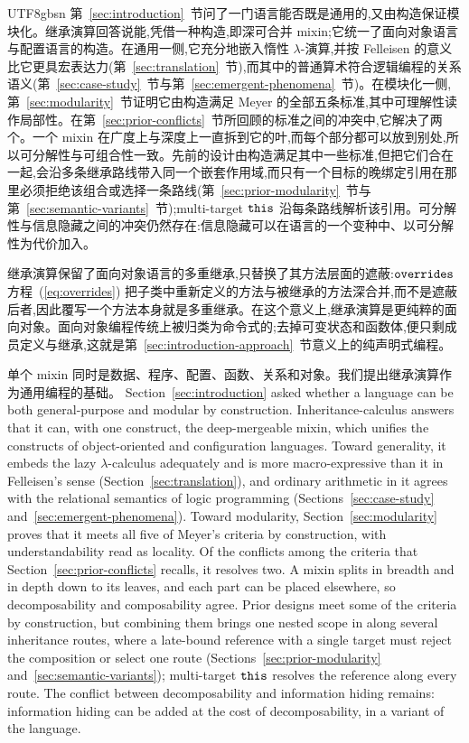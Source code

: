 \begin{CJK*}{UTF8}{gbsn}
\ifPaperChinese
第~\ref{sec:introduction}~节问了一门语言能否既是通用的,又由构造保证模块化。继承演算回答说能,凭借一种构造,即深可合并 mixin;它统一了面向对象语言与配置语言的构造。在通用一侧,它充分地嵌入惰性 $\lambda$-演算,并按 Felleisen 的意义比它更具宏表达力(第~\ref{sec:translation}~节),而其中的普通算术符合逻辑编程的关系语义(第~\ref{sec:case-study}~节与第~\ref{sec:emergent-phenomena}~节)。在模块化一侧,第~\ref{sec:modularity}~节证明它由构造满足 Meyer 的全部五条标准,其中可理解性读作局部性。在第~\ref{sec:prior-conflicts}~节所回顾的标准之间的冲突中,它解决了两个。一个 mixin 在广度上与深度上一直拆到它的叶,而每个部分都可以放到别处,所以可分解性与可组合性一致。先前的设计由构造满足其中一些标准,但把它们合在一起,会沿多条继承路线带入同一个嵌套作用域,而只有一个目标的晚绑定引用在那里必须拒绝该组合或选择一条路线(第~\ref{sec:prior-modularity}~节与第~\ref{sec:semantic-variants}~节);multi-target $\mathtt{this}$ 沿每条路线解析该引用。可分解性与信息隐藏之间的冲突仍然存在:信息隐藏可以在语言的一个变种中、以可分解性为代价加入。

继承演算保留了面向对象语言的多重继承,只替换了其方法层面的遮蔽:$\mathtt{overrides}$ 方程~(\ref{eq:overrides}) 把子类中重新定义的方法与被继承的方法深合并,而不是遮蔽后者,因此覆写一个方法本身就是多重继承。在这个意义上,继承演算是更纯粹的面向对象。面向对象编程传统上被归类为命令式的;去掉可变状态和函数体,便只剩成员定义与继承,这就是第~\ref{sec:introduction-approach}~节意义上的纯声明式编程。

单个 mixin 同时是数据、程序、配置、函数、关系和对象。我们提出继承演算作为通用编程的基础。
\else
Section~\ref{sec:introduction} asked whether a language can be both
general-purpose and modular by construction. Inheritance-calculus answers
that it can, with one construct, the deep-mergeable mixin, which unifies the
constructs of object-oriented and configuration languages. Toward generality, it embeds the lazy
$\lambda$-calculus adequately and is more macro-expressive than it in
Felleisen's sense (Section~\ref{sec:translation}), and ordinary arithmetic
in it agrees with the relational semantics of logic programming
(Sections~\ref{sec:case-study} and~\ref{sec:emergent-phenomena}). Toward
modularity, Section~\ref{sec:modularity} proves that it meets all five of
Meyer's criteria by construction, with understandability read as locality.
Of the conflicts among the criteria that Section~\ref{sec:prior-conflicts} recalls, it resolves two.
A mixin splits in breadth and in depth down to its leaves, and each part can be placed elsewhere, so
decomposability and composability agree.
Prior designs meet some of the criteria by construction, but combining them brings one nested scope in
along several inheritance routes, where a late-bound reference with a single target must reject the
composition or select one route (Sections~\ref{sec:prior-modularity}
and~\ref{sec:semantic-variants}); multi-target $\mathtt{this}$ resolves the reference along every route.
The conflict between decomposability and information hiding remains: information hiding can be added at
the cost of decomposability, in a variant of the language.


\end{CJK*}
